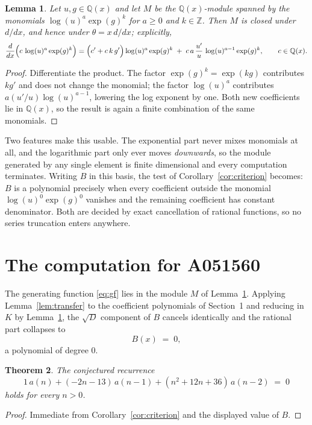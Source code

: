 \documentclass[11pt,a4paper]{article}
\theoremstyle{plain}
\newtheorem{theorem}{Theorem}
\newtheorem{lemma}[theorem]{Lemma}
\theoremstyle{definition}
\begin{document}
\begin{lemma}\label{lem:field}
Let $u,g\in\mathbb{Q}(x)$ and let $M$ be the $\mathbb{Q}(x)$-module spanned by the
monomials $\log(u)^{a}\exp(g)^{k}$ for $a\ge0$ and $k\in\mathbb{Z}$. Then $M$ is closed
under $d/dx$, and hence under $\theta=x\,d/dx$; explicitly,
\[
\frac{d}{dx}\Bigl(c\,\log(u)^{a}\exp(g)^{k}\Bigr)
=\Bigl(c'+c\,k\,g'\Bigr)\log(u)^{a}\exp(g)^{k}
\;+\;c\,a\,\frac{u'}{u}\,\log(u)^{a-1}\exp(g)^{k},
\qquad c\in\mathbb{Q}(x).
\]
\end{lemma}

\begin{proof}
Differentiate the product. The factor $\exp(g)^{k}=\exp(kg)$ contributes $kg'$ and does
not change the monomial; the factor $\log(u)^{a}$ contributes $a(u'/u)\log(u)^{a-1}$,
lowering the log exponent by one. Both new coefficients lie in $\mathbb{Q}(x)$, so the
result is again a finite combination of the same monomials.
\end{proof}

Two features make this usable. The exponential part never mixes monomials at all, and the
logarithmic part only ever moves \emph{downwards}, so the module generated by any single
element is finite dimensional and every computation terminates. Writing $B$ in this basis,
the test of Corollary~\ref{cor:criterion} becomes: $B$ is a polynomial precisely when every
coefficient outside the monomial $\log(u)^{0}\exp(g)^{0}$ vanishes and the remaining
coefficient has constant denominator. Both are decided by exact cancellation of rational
functions, so no series truncation enters anywhere.

\section{The computation for A051560}

The generating function \eqref{eq:gf} lies in the module $M$ of
Lemma~\ref{lem:field}.
Applying Lemma~\ref{lem:transfer} to the coefficient polynomials of Section~1 and reducing
in $K$ by Lemma~\ref{lem:field}, the $\sqrt{D}$ component of $B$ cancels identically and
the rational part collapses to
\[
B(x)\;=\;0 ,
\]
a polynomial of degree $0$.

\begin{theorem}
The conjectured recurrence
\[
1\,a(n) + (- 2 n - 13)\,a(n-1) + (n^{2} + 12 n + 36)\,a(n-2) \;=\;0
\]
holds for every $n>0$.
\end{theorem}

\begin{proof}
Immediate from Corollary~\ref{cor:criterion} and the displayed value of $B$.
\end{proof}
\end{document}
